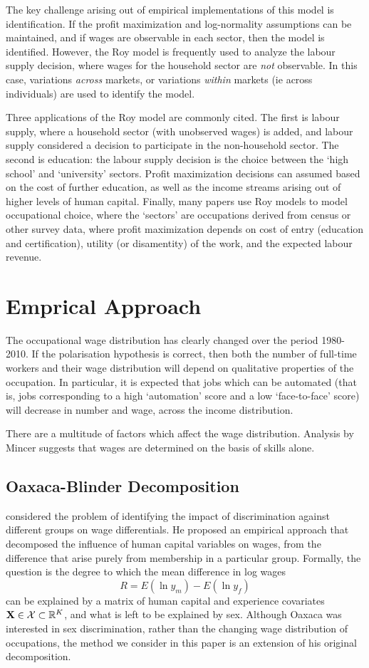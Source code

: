 The key challenge arising out of empirical implementations of this model is identification. If the profit maximization and log-normality assumptions can be maintained, and if wages are observable in each sector, then the model is identified. However, the Roy model is frequently used to analyze the labour supply decision, where wages for the household sector are {\em not} observable. In this case, variations {\em across } markets, or variations {\em within } markets (ie across individuals) are used to identify the model.

Three applications of the Roy model are commonly cited. The first is labour supply, where a household sector (with unobserved wages) is added, and labour supply considered a decision to participate in the non-household sector. The second is education: the labour supply decision is the choice between the `high school' and `university' sectors. Profit maximization decisions can assumed based on the cost of further education, as well as the income streams arising out of higher levels of human capital. Finally, many papers use Roy models to model occupational choice, where the `sectors' are occupations derived from census or other survey data, where profit maximization depends on cost of entry (education and certification), utility (or disamentity) of the work, and the expected labour revenue.

\section{Emprical Approach}
The occupational wage distribution has clearly changed over the period 1980-2010. If the polarisation hypothesis is correct, then both the number of full-time workers and their wage distribution will depend on qualitative properties of the occupation. In particular, it is expected that jobs which can be automated (that is, jobs corresponding to a high `automation' score and a low `face-to-face' score) will decrease in number and wage, across the income distribution.

There are a multitude of factors which affect the wage distribution. Analysis by Mincer suggests that wages are determined on the basis of skills alone.

\subsection{Oaxaca-Blinder Decomposition}

\citet{Oaxaca1973} considered the problem of identifying the impact of discrimination against different groups on wage differentials. He proposed an empirical approach that decomposed the influence of human capital variables on wages, from the difference that arise purely from membership in a particular group. Formally, the question is the degree to which the mean difference in log wages 
$$ R = E(\ln y_m) - E(\ln y_f) $$ 
can be explained by a matrix of human capital and experience covariates $\mathbf{X}\in\mathcal{X}\subset\mathbb{R}^K$, and what is left to be explained by sex. Although Oaxaca was interested in sex discrimination, rather than the changing wage distribution of occupations, the method we consider in this paper is an extension of his original decomposition.

